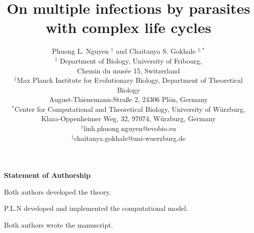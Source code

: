 \documentclass[a4paper]{scrartcl}
\begin{document}
\sffamily
\title{
On multiple infections by parasites with complex life cycles
}   
\author{Phuong L. Nguyen $^{\dag}$ and Chaitanya S. Gokhale $^{\ddag,\ast}$\\
\small{$^\dag$ Department of Biology, University of Fribourg,}\\
\small{Chemin du mus\'{e}e 15, Switzerland}\\
\small{$^\ddag$Max Planck Institute for Evolutionary Biology, Department of Theoretical Biology}\\
\small{August-Thienemann-Stra{\ss}e 2, 24306 Pl\"{o}n, Germany}\\
\small{$^\ast$Center for Computational and Theoretical Biology, University of W\"{u}rzburg,}\\
\small{Klara-Oppenheimer Weg, 32, 97074, W\"{u}rzburg, Germany}\\
\small{$^\dag$linh.phuong.nguyen@evobio.eu}\\
\small{$^\ddag$chaitanya.gokhale@uni-wuerzburg.de}
}

\date{}
\maketitle

\textbf{Statement of Authorship}

Both authors developed the theory.

P.L.N developed and implemented the computational model.

Both authors wrote the manuscript.

\linenumbers

\end{document}
